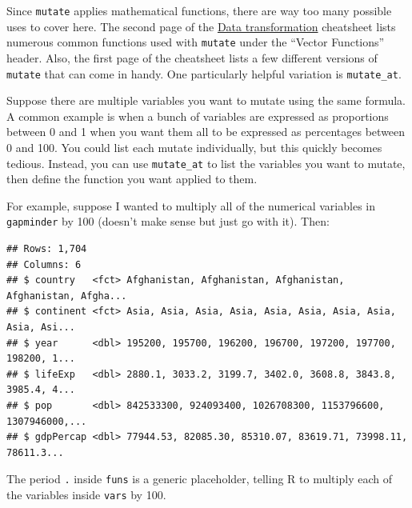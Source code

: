 \documentclass[
]{book}
\newenvironment{Shaded}{\begin{snugshade}}{\end{snugshade}}
\newcommand{\DecValTok}[1]{\textcolor[rgb]{0.00,0.00,0.81}{#1}}
\newcommand{\KeywordTok}[1]{\textcolor[rgb]{0.13,0.29,0.53}{\textbf{#1}}}
\newcommand{\NormalTok}[1]{#1}
\newcommand{\OperatorTok}[1]{\textcolor[rgb]{0.81,0.36,0.00}{\textbf{#1}}}
\newcommand{\StringTok}[1]{\textcolor[rgb]{0.31,0.60,0.02}{#1}}
\begin{document}
Since \texttt{mutate} applies mathematical functions, there are way too many possible uses to cover here. The second page of the \href{https://github.com/rstudio/cheatsheets/raw/master/data-transformation.pdf}{Data transformation} cheatsheet lists numerous common functions used with \texttt{mutate} under the ``Vector Functions'' header. Also, the first page of the cheatsheet lists a few different versions of \texttt{mutate} that can come in handy. One particularly helpful variation is \texttt{mutate\_at}.

Suppose there are multiple variables you want to mutate using the same formula. A common example is when a bunch of variables are expressed as proportions between 0 and 1 when you want them all to be expressed as percentages between 0 and 100. You could list each mutate individually, but this quickly becomes tedious. Instead, you can use \texttt{mutate\_at} to list the variables you want to mutate, then define the function you want applied to them.

For example, suppose I wanted to multiply all of the numerical variables in \texttt{gapminder} by 100 (doesn't make sense but just go with it). Then:

\begin{Shaded}
\end{Shaded}

\begin{verbatim}
## Rows: 1,704
## Columns: 6
## $ country   <fct> Afghanistan, Afghanistan, Afghanistan, Afghanistan, Afgha...
## $ continent <fct> Asia, Asia, Asia, Asia, Asia, Asia, Asia, Asia, Asia, Asi...
## $ year      <dbl> 195200, 195700, 196200, 196700, 197200, 197700, 198200, 1...
## $ lifeExp   <dbl> 2880.1, 3033.2, 3199.7, 3402.0, 3608.8, 3843.8, 3985.4, 4...
## $ pop       <dbl> 842533300, 924093400, 1026708300, 1153796600, 1307946000,...
## $ gdpPercap <dbl> 77944.53, 82085.30, 85310.07, 83619.71, 73998.11, 78611.3...
\end{verbatim}

The period \texttt{.} inside \texttt{funs} is a generic placeholder, telling R to multiply each of the variables inside \texttt{vars} by 100.
\end{document}
